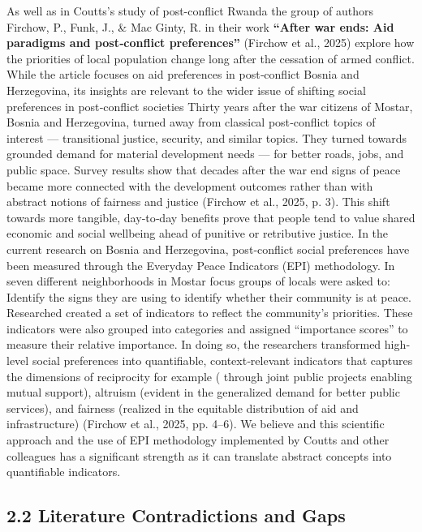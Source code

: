 \documentclass[14pt]{article}
\theoremstyle{remark}
\begin{document}
As well as in Coutts's study of post-conflict Rwanda the group of authors Firchow, P., Funk, J., \& Mac Ginty, R. in their work \textbf{``After war ends: Aid paradigms and post‐conflict preferences''} (Firchow et al., 2025) explore how the priorities of local population change long after the cessation of armed conflict. While the article focuses on aid preferences in post‐conflict Bosnia and Herzegovina, its insights are relevant to the wider issue of shifting social preferences in post‐conflict societies Thirty years after the war citizens of Mostar, Bosnia and Herzegovina, turned away from classical post‐conflict topics of interest --- transitional justice, security, and similar topics. They turned towards grounded demand for material development needs --- for better roads, jobs, and public space. Survey results show that decades after the war end signs of peace became more connected with the development outcomes rather than with abstract notions of fairness and justice (Firchow et al., 2025, p. 3). This shift towards more tangible, day‐to‐day benefits prove that people tend to value shared economic and social wellbeing ahead of punitive or retributive justice. In the current research on Bosnia and Herzegovina, post‐conflict social preferences have been measured through the Everyday Peace Indicators (EPI) methodology. In seven different neighborhoods in Mostar focus groups of locals were asked to: Identify the signs they are using to identify whether their community is at peace. Researched created a set of indicators to reflect the community's priorities. These indicators were also grouped into categories and assigned ``importance scores'' to measure their relative importance. In doing so, the researchers transformed high‐level social preferences into quantifiable, context‐relevant indicators that captures the dimensions of reciprocity for example ( through joint public projects enabling mutual support), altruism (evident in the generalized demand for better public services), and fairness (realized in the equitable distribution of aid and infrastructure) (Firchow et al., 2025, pp. 4--6). We believe and this scientific approach and the use of EPI methodology implemented by Coutts and other colleagues has a significant strength as it can translate abstract concepts into quantifiable indicators.

\subsection{2.2 Literature Contradictions and Gaps}
\end{document}
